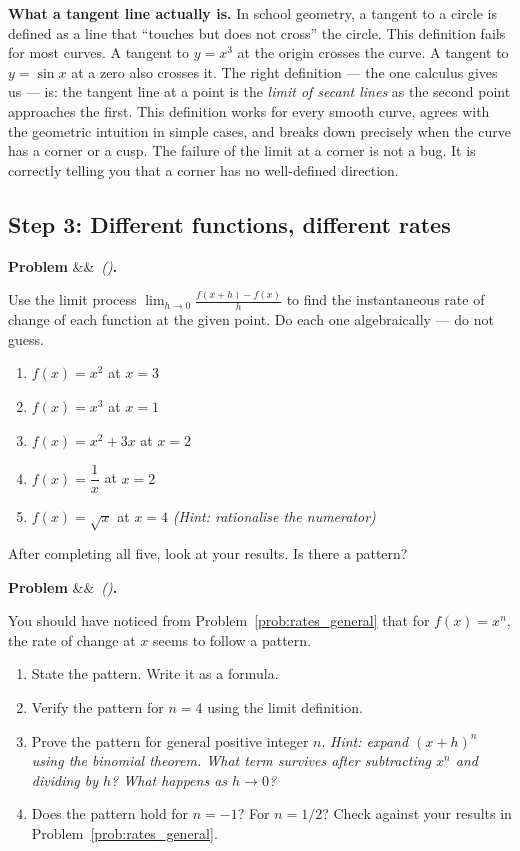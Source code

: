 \documentclass[12pt, a4paper]{article}
\newcounter{problem}
\newenvironment{problem}[1][]{%
  \refstepcounter{problem}%
  \par\vspace{6pt}%
  \noindent\textbf{\color{MidBlue}Problem \theproblem}%
  \ifx&#1&\else\ \textit{(#1)}\fi\textbf{.}\enskip
}{\par\vspace{4pt}}
\begin{document}
\begin{thought}
\textbf{What a tangent line actually is.}
In school geometry, a tangent to a circle is defined as a line that ``touches but does not cross'' the circle. This definition fails for most curves. A tangent to $y = x^3$ at the origin crosses the curve. A tangent to $y = \sin x$ at a zero also crosses it. The right definition --- the one calculus gives us --- is: the tangent line at a point is the \emph{limit of secant lines} as the second point approaches the first. This definition works for every smooth curve, agrees with the geometric intuition in simple cases, and breaks down precisely when the curve has a corner or a cusp. The failure of the limit at a corner is not a bug. It is correctly telling you that a corner has no well-defined direction.
\end{thought}

\subsection{Step 3: Different functions, different rates}

\begin{problem}
\label{prob:rates_general}
Use the limit process $\displaystyle\lim_{h \to 0} \frac{f(x+h) - f(x)}{h}$ to find the instantaneous rate of change of each function at the given point. Do each one algebraically --- do not guess.

\begin{enumerate}[label=(\alph*), topsep=2pt]
  \item $f(x) = x^2$ at $x = 3$
  \item $f(x) = x^3$ at $x = 1$
  \item $f(x) = x^2 + 3x$ at $x = 2$
  \item $f(x) = \dfrac{1}{x}$ at $x = 2$
  \item $f(x) = \sqrt{x}$ at $x = 4$ \quad \textit{(Hint: rationalise the numerator)}
\end{enumerate}

After completing all five, look at your results. Is there a pattern?
\end{problem}

\begin{problem}
\label{prob:pattern}
You should have noticed from Problem~\ref{prob:rates_general} that for $f(x) = x^n$, the rate of change at $x$ seems to follow a pattern.

\begin{enumerate}[label=(\alph*), topsep=2pt]
  \item State the pattern. Write it as a formula.
  \item Verify the pattern for $n = 4$ using the limit definition.
  \item Prove the pattern for general positive integer $n$. \textit{Hint: expand $(x+h)^n$ using the binomial theorem. What term survives after subtracting $x^n$ and dividing by $h$? What happens as $h \to 0$?}
  \item Does the pattern hold for $n = -1$? For $n = 1/2$? Check against your results in Problem~\ref{prob:rates_general}.
\end{enumerate}
\end{problem}
\end{document}
